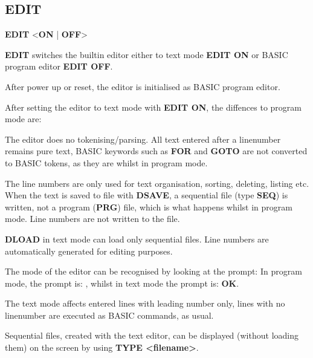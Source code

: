 \subsection{EDIT}
\begin{description}[leftmargin=2cm,style=nextline]
\item [Format:] {\bf EDIT} <{\bf ON} | {\bf OFF}>

\item [Usage:]  {\bf EDIT} switches the builtin editor
               either to text mode {\bf EDIT ON}
               or BASIC program editor {\bf EDIT OFF}.

               After power up or reset, the editor
               is initialised as BASIC program editor.

               After setting the editor to text mode with
               {\bf EDIT ON}, the diffences to program mode are:

               The editor does no tokenising/parsing.
               All text entered after a linenumber remains pure text,
               BASIC keywords such as {\bf FOR} and {\bf GOTO} are not
               converted to BASIC tokens, as they are whilst in program mode.

               The line numbers are only used for text organisation,
               sorting, deleting, listing etc.
               When the text is saved to file with {\bf DSAVE},
               a sequential file (type {\bf SEQ}) is written, not a
               program ({\bf PRG}) file, which is what happens whilst in program mode.
               Line numbers are not written to the file.

               {\bf DLOAD} in text mode can load only sequential files.
               Line numbers are automatically generated for editing purposes.

               The mode of the editor can be recognised by looking at the prompt:
               In program mode, the prompt is: , whilst in text mode
               the prompt is: {\bf OK}.

               The text mode affects entered lines with leading number only,
               lines with no linenumber are executed as BASIC commands,
               as usual.

               Sequential files, created with the text editor, can be displayed
               (without loading them)
               on the screen by using {\bf TYPE <filename>}.


\end{description}
